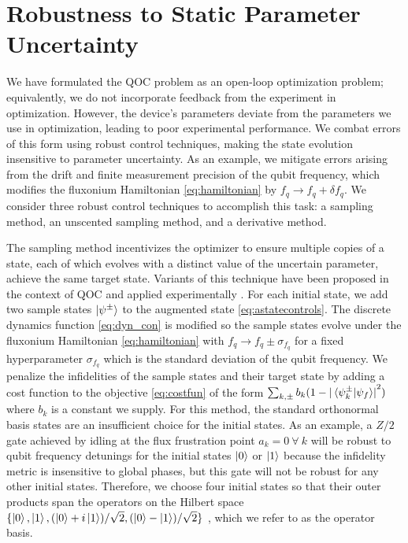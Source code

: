 \section{Robustness to Static Parameter Uncertainty \label{sec:static}}
We have formulated the QOC
problem as an open-loop optimization problem; equivalently,
we do not incorporate feedback from the experiment in optimization.
However, the device's parameters deviate from the parameters we use in optimization,
leading to poor experimental performance. We combat errors
of this form using robust control techniques,
making the state evolution insensitive
to parameter uncertainty. As an example,
we mitigate errors arising from the drift and finite measurement
precision of the qubit frequency, which modifies the fluxonium Hamiltonian
\eqref{eq:hamiltonian} by $f_{q} \rightarrow f_{q} + \delta f_{q}$.
We consider three robust control techniques to accomplish this task:
a sampling method, an unscented sampling method,
and a derivative method.

The sampling method incentivizes the optimizer
to ensure multiple copies of a state, each of which evolves
with a distinct value of the uncertain parameter, achieve
the same target state. Variants of this technique have been proposed
in the context of QOC
\cite{allen2019robust, ball2020software, khaneja2005optimal,
  reinhold2019controlling, rembold2020introduction} and applied
experimentally \cite{carvalho2020error}.
For each initial state,
we add two sample states $\ket{\psi^{\pm}}$
to the augmented state \eqref{eq:astatecontrols}. The discrete dynamics
function \eqref{eq:dyn_con} is modified
so the sample states evolve under the fluxonium Hamiltonian \eqref{eq:hamiltonian}
with $f_{q} \rightarrow f_{q} \pm \sigma_{f_{q}}$ for a fixed
hyperparameter $\sigma_{f_{q}}$ which is the standard deviation of the qubit frequency.
We penalize the infidelities of the sample states and their target state
by adding a cost function to the objective \eqref{eq:costfun} of the form
$\sum_{k, \pm} b_{k} (1 - {\lvert \braket*{\psi^{\pm}_{k}}{\psi_{f}} \rvert}^{2})$
where $b_{k}$ is a constant we supply.
For this method, the standard orthonormal basis states are an insufficient choice
for the initial states. As an example, a $Z/2$ gate achieved by idling
at the flux frustration point $a_{k} = 0 \ \forall \ k$
will be robust to qubit frequency detunings for the initial states $\ket{0}$
or $\ket{1}$ because the infidelity metric is insensitive to global phases,
but this gate will not be robust for any other initial states.
Therefore, we choose four initial states
so that their outer products
span the operators on the Hilbert space
$\{\ket{0}, \ket{1}, (\ket{0} + i\ket{1}) / \sqrt{2},
(\ket{0} - \ket{1}) / \sqrt{2}\}$ \cite{chow2009randomized},
which we refer to as the operator basis.

